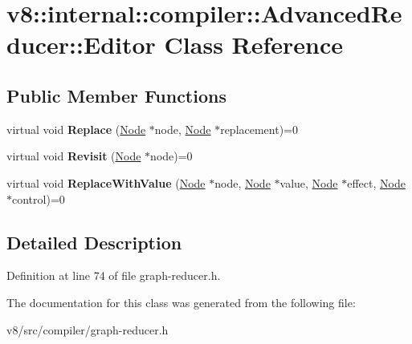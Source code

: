 \hypertarget{classv8_1_1internal_1_1compiler_1_1AdvancedReducer_1_1Editor}{}\section{v8\+:\+:internal\+:\+:compiler\+:\+:Advanced\+Reducer\+:\+:Editor Class Reference}
\label{classv8_1_1internal_1_1compiler_1_1AdvancedReducer_1_1Editor}
\subsection*{Public Member Functions}
\begin{DoxyCompactItemize}
\item 
\mbox{\label{classv8_1_1internal_1_1compiler_1_1AdvancedReducer_1_1Editor_abc36cb3b1180e6f1d7503f23e3ce6599}} 
virtual void {\bfseries Replace} (\mbox{\hyperlink{classv8_1_1internal_1_1compiler_1_1Node}{Node}} $\ast$node, \mbox{\hyperlink{classv8_1_1internal_1_1compiler_1_1Node}{Node}} $\ast$replacement)=0
\item 
\mbox{\label{classv8_1_1internal_1_1compiler_1_1AdvancedReducer_1_1Editor_af5bf4b059b3da8aef10460e84e9daede}} 
virtual void {\bfseries Revisit} (\mbox{\hyperlink{classv8_1_1internal_1_1compiler_1_1Node}{Node}} $\ast$node)=0
\item 
\mbox{\label{classv8_1_1internal_1_1compiler_1_1AdvancedReducer_1_1Editor_a9884e9cb51038a662e9dfc1da53af593}} 
virtual void {\bfseries Replace\+With\+Value} (\mbox{\hyperlink{classv8_1_1internal_1_1compiler_1_1Node}{Node}} $\ast$node, \mbox{\hyperlink{classv8_1_1internal_1_1compiler_1_1Node}{Node}} $\ast$value, \mbox{\hyperlink{classv8_1_1internal_1_1compiler_1_1Node}{Node}} $\ast$effect, \mbox{\hyperlink{classv8_1_1internal_1_1compiler_1_1Node}{Node}} $\ast$control)=0
\end{DoxyCompactItemize}


\subsection{Detailed Description}


Definition at line 74 of file graph-\/reducer.\+h.



The documentation for this class was generated from the following file\+:\begin{DoxyCompactItemize}
\item 
v8/src/compiler/graph-\/reducer.\+h\end{DoxyCompactItemize}
